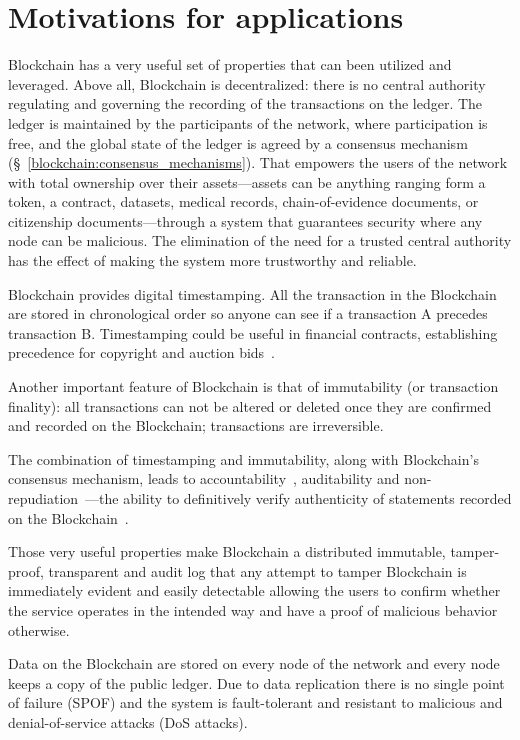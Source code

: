 \section{Motivations for applications}\label{problem:motivations}

Blockchain has a very useful set of properties that can been utilized and leveraged. Above all, Blockchain is decentralized: there is no central authority regulating and governing the recording of the transactions on the ledger. The ledger is maintained by the participants of the network, where participation is free, and the global state of the ledger is agreed by a consensus mechanism (§~\ref{blockchain:consensus_mechanisms}). That empowers the users of the network with total ownership over their assets---assets can be anything ranging form a token, a contract, datasets, medical records, chain-of-evidence documents, or citizenship documents---through a system that guarantees security where any node can be malicious. The elimination of the need for a trusted central authority has the effect of making the system more trustworthy and reliable.

Blockchain provides digital timestamping. All the transaction in the Blockchain are stored in chronological order so anyone can see if a transaction A precedes transaction B. Timestamping could be useful in financial contracts, establishing precedence for copyright and auction bids~\cite{bl_auditability}.

Another important feature of Blockchain is that of immutability (or transaction finality): all transactions can not be altered or deleted once they are confirmed and recorded on the Blockchain; transactions are irreversible.

The combination of timestamping and immutability, along with Blockchain's consensus mechanism, leads to  accountability~\cite{10.1007/978-3-540-46588-1_20}, auditability and non-repudiation~\cite{wiki:non_repudiation}---the ability
to definitively verify authenticity of statements recorded on the Blockchain~\cite{bl_auditability}.

Those very useful properties make Blockchain a distributed immutable, tamper-proof, transparent and audit log that any attempt to tamper Blockchain is immediately evident and easily detectable allowing the users to confirm whether the service operates in the intended way and have a proof of malicious behavior otherwise.

Data on the Blockchain are stored on every node of the network and every node keeps a copy of the public ledger. Due to data replication there is no single point of failure (SPOF) and the system is fault-tolerant and resistant to malicious and denial-of-service attacks (DoS attacks).

